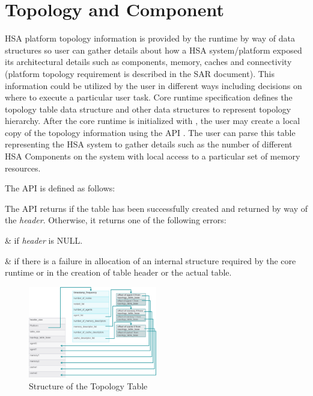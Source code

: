 \hypertarget{component}{}\section{Topology and Component
}\label{topology}
HSA platform topology information is provided by the runtime by way of
data structures so user can gather details about how a HSA
system/platform exposed its architectural details such as
components, memory, caches and connectivity (platform topology
requirement is described in the SAR document). This information
could be utilized by the user in different ways including decisions
on where to execute a particular user task. Core runtime
specification defines the topology table data structure and other
data structures to represent topology hierarchy.  After the core
runtime is initialized with , the user may create a
local copy of the topology information using the API
. The user can parse this table
representing the HSA system to gather details such as the number of
different HSA Components on the system with local access to a
particular set of memory resources.

The  API is defined as follows:



The API returns  if the table has been
successfully created and returned by way of the {\itshape header}. Otherwise,
it returns one of the following errors:

\begin{easylist}
&  if {\itshape header}
is NULL.

&  if there is a failure
in allocation of an internal structure required by the core runtime
or in the creation of table header or the actual table.
\end{easylist}

\begin{figure}
  \centering
  \includegraphics[width=0.5\textwidth]{topologytable}
  \centering
  \caption{Structure of the Topology Table}
  \label{fig:topology_table}
\end{figure}

